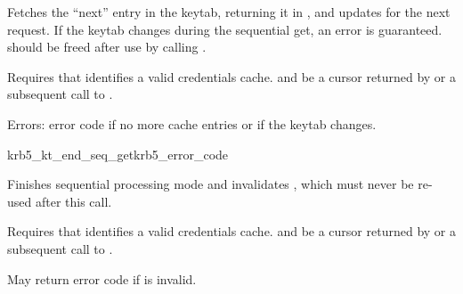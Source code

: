 Fetches the ``next'' entry in the keytab, returning it in
, and updates  for the next
request.  If the keytab changes during the sequential get, an error is
guaranteed.   should be freed after use by calling
.

Requires that  identifies a valid credentials cache.  and
 be a cursor returned by
 or a subsequent call to
.

Errors: error code if no more cache entries or if the keytab changes.

\begin{funcdecl}{krb5_kt_end_seq_get}{krb5_error_code}{\funcin}
\end{funcdecl}

Finishes sequential processing mode and invalidates ,
which must never be re-used after this call.

Requires that  identifies a valid credentials cache.  and
 be a cursor returned by
 or a subsequent call to
.

May return error code if  is invalid.

